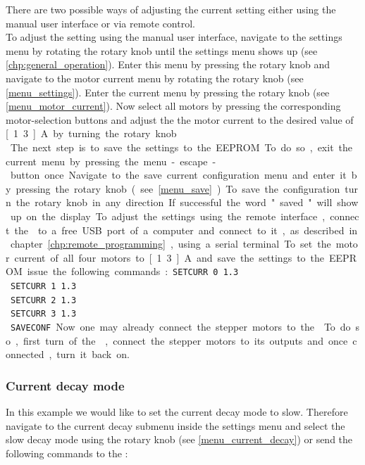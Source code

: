 There are two possible ways of adjusting the current setting either using the manual user interface or via remote control.\\
To adjust the setting using the manual user interface, navigate to the settings menu by rotating the rotary knob until the settings menu shows up (see \ref{chp:general_operation}). Enter this menu by pressing the rotary knob and navigate to the motor current menu by rotating the rotary knob (see \ref{menu_settings}). Enter the current menu by pressing the rotary knob (see \ref{menu_motor_current}). Now select all motors by pressing the corresponding motor-selection buttons and adjust the the motor current to the desired value of \unit[1.3]{A} by turning the rotary knob.\\
The next step is to save the settings to the EEPROM. To do so, exit the current menu by pressing the menu-escape-button once. Navigate to the save current configuration menu and enter it by pressing the rotary knob (see \ref{menu_save}). To save the configuration turn the rotary knob in any direction. If successful the word "saved" will show up on the display.

To adjust the settings using the remote interface, connect the \productName ~to a free USB port of a computer and connect to it, as described in chapter \ref{chp:remote_programming}, using a serial terminal. To set the motor current of all four motors to \unit[1.3]{A} and save the settings to the EEPROM issue the following commands:

\texttt{SETCURR 0 1.3}\\
\texttt{SETCURR 1 1.3}\\
\texttt{SETCURR 2 1.3}\\
\texttt{SETCURR 3 1.3}\\
\texttt{SAVECONF}

Now one may already connect the stepper motors to the \productName . To do so, first turn of the \productName , connect the stepper motors to its outputs and once connected, turn it back on.

\subsubsection{Current decay mode}
In this example we would like to set the current decay mode to slow. Therefore navigate to the current decay submenu inside the settings menu and select the slow decay mode using the rotary knob (see \ref{menu_current_decay}) or send the following commands to the \productName :

